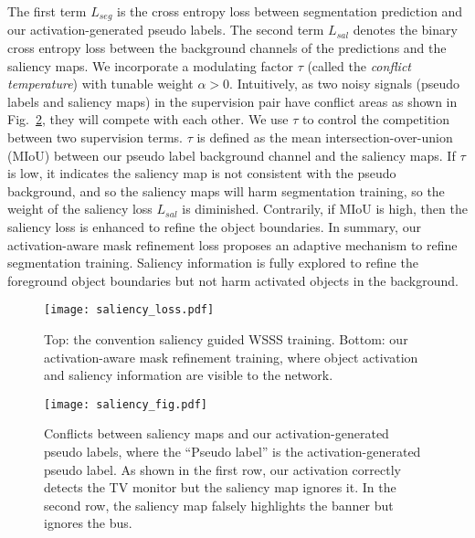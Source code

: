 \documentclass[10pt,twocolumn,letterpaper]{article}
\begin{document}
The first term $L_{seg}$ is the cross entropy loss between segmentation prediction and our activation-generated pseudo labels.
The second term $L_{sal}$ denotes the binary cross entropy loss between the background channels of the predictions and the saliency maps.
We incorporate a modulating factor $\tau$ (called the \emph{conflict temperature}) with tunable weight $\alpha > 0$.
Intuitively, as two noisy signals (pseudo labels and saliency maps) in the supervision pair have conflict areas as shown in Fig.~\ref{saliency_fig}, they will compete with each other.
We use $\tau$ to control the competition between two supervision terms. $\tau$ is
defined as the mean intersection-over-union (MIoU) between our pseudo label background channel and 
the saliency maps.
If  $\tau$ is
low, it indicates the saliency map is not consistent with the pseudo background, and so the saliency maps will harm  segmentation training,
so the weight of the saliency loss $L_{sal}$ is diminished. 
Contrarily, if MIoU is high, then the saliency loss is enhanced to refine the object boundaries.
In summary, our activation-aware mask refinement loss proposes an adaptive mechanism to refine segmentation training.
Saliency information is fully explored to refine the foreground object boundaries but not harm activated objects in the background.


\begin{figure}[!t]
   \begin{center}
   {\texttt{[image: saliency\_loss.pdf]}}
   \end{center}
\caption{Top: the convention saliency guided WSSS training.
Bottom: our activation-aware mask refinement training, where object activation and saliency information are visible to the network.
}
\vspace{-2mm}
   \label{fig: saliency model}
\end{figure}


\begin{figure}[!htb]
   \begin{center}
   {\texttt{[image: saliency\_fig.pdf]}}
   \end{center}
\caption{Conflicts between saliency maps and our activation-generated pseudo labels, where the \enquote{Pseudo label} is the
activation-generated pseudo label.
As shown in the first row, our activation correctly detects the TV monitor but the saliency map 
ignores it.
In the second row, the saliency map falsely highlights the banner but ignores the bus.}
   \label{saliency_fig}
\end{figure}
\end{document}
